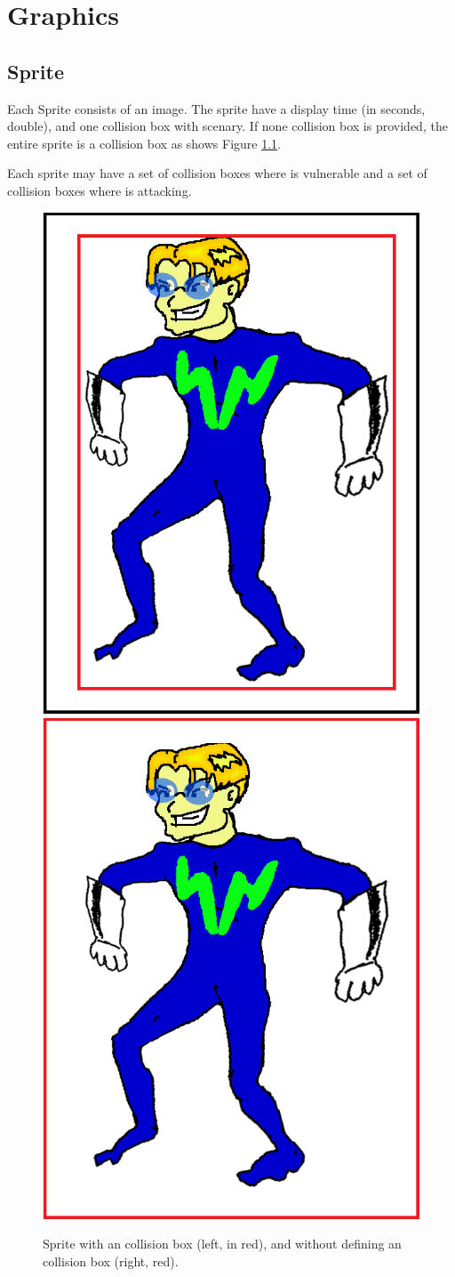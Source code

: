 \chapter{Graphics}

\section{Sprite}
	Each Sprite consists of an image. The sprite have a display time (in seconds, double), and one collision box with scenary. If none collision box is provided, the entire sprite is a collision box as shows Figure \ref{spriteCollisionBox}.
	
	Each sprite may have a set of collision boxes where is vulnerable and a set of collision boxes where is attacking.
	
	\begin{figure}[H]
		\centering
		\includegraphics[width=0.45 \textwidth] {img/colisionbox.png}
		\includegraphics[width=0.45 \textwidth] {img/nocolisionbox.png}
		\caption {Sprite with an collision box (left, in red), and without defining an collision box (right, red).}
		\label{spriteCollisionBox}
	\end{figure}

